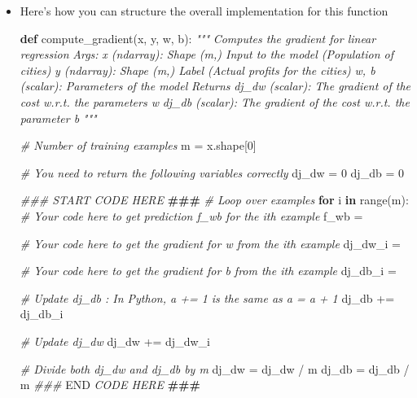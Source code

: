 \documentclass[11pt]{article}
\newenvironment{Shaded}{}{}
\newcommand{\KeywordTok}[1]{\textcolor[rgb]{0.00,0.44,0.13}{\textbf{{#1}}}}
\newcommand{\DecValTok}[1]{\textcolor[rgb]{0.25,0.63,0.44}{{#1}}}
\newcommand{\CommentTok}[1]{\textcolor[rgb]{0.38,0.63,0.69}{\textit{{#1}}}}
\newcommand{\AlertTok}[1]{\textcolor[rgb]{1.00,0.00,0.00}{\textbf{{#1}}}}
\newcommand{\RegionMarkerTok}[1]{{#1}}
\newcommand{\NormalTok}[1]{{#1}}
\newcommand{\ControlFlowTok}[1]{\textcolor[rgb]{0.00,0.44,0.13}{\textbf{{#1}}}}
\newcommand{\OperatorTok}[1]{\textcolor[rgb]{0.40,0.40,0.40}{{#1}}}
\newcommand{\BuiltInTok}[1]{{#1}}
\begin{document}
\begin{itemize}
\item
  Here's how you can structure the overall implementation for this
  function

\begin{Shaded}
\begin{Highlighting}[]
\KeywordTok{def}\NormalTok{ compute\_gradient(x, y, w, b): }
    \CommentTok{"""}
\CommentTok{    Computes the gradient for linear regression }
\CommentTok{    Args:}
\CommentTok{      x (ndarray): Shape (m,) Input to the model (Population of cities) }
\CommentTok{      y (ndarray): Shape (m,) Label (Actual profits for the cities)}
\CommentTok{      w, b (scalar): Parameters of the model  }
\CommentTok{    Returns}
\CommentTok{      dj\_dw (scalar): The gradient of the cost w.r.t. the parameters w}
\CommentTok{      dj\_db (scalar): The gradient of the cost w.r.t. the parameter b     }
\CommentTok{     """}

    \CommentTok{\# Number of training examples}
\NormalTok{    m }\OperatorTok{=}\NormalTok{ x.shape[}\DecValTok{0}\NormalTok{]}

    \CommentTok{\# You need to return the following variables correctly}
\NormalTok{    dj\_dw }\OperatorTok{=} \DecValTok{0}
\NormalTok{    dj\_db }\OperatorTok{=} \DecValTok{0}

    \CommentTok{\#\#\# START CODE HERE }\AlertTok{\#\#\#}\CommentTok{ }
    \CommentTok{\# Loop over examples}
    \ControlFlowTok{for}\NormalTok{ i }\KeywordTok{in} \BuiltInTok{range}\NormalTok{(m):  }
        \CommentTok{\# Your code here to get prediction f\_wb for the ith example}
\NormalTok{        f\_wb }\OperatorTok{=} 

        \CommentTok{\# Your code here to get the gradient for w from the ith example }
\NormalTok{        dj\_dw\_i }\OperatorTok{=} 

        \CommentTok{\# Your code here to get the gradient for b from the ith example }
\NormalTok{        dj\_db\_i }\OperatorTok{=} 

        \CommentTok{\# Update dj\_db : In Python, a += 1  is the same as a = a + 1}
\NormalTok{        dj\_db }\OperatorTok{+=}\NormalTok{ dj\_db\_i}

        \CommentTok{\# Update dj\_dw}
\NormalTok{        dj\_dw }\OperatorTok{+=}\NormalTok{ dj\_dw\_i}

    \CommentTok{\# Divide both dj\_dw and dj\_db by m}
\NormalTok{    dj\_dw }\OperatorTok{=}\NormalTok{ dj\_dw }\OperatorTok{/}\NormalTok{ m}
\NormalTok{    dj\_db }\OperatorTok{=}\NormalTok{ dj\_db }\OperatorTok{/}\NormalTok{ m}
    \CommentTok{\#\#\# }\RegionMarkerTok{END}\CommentTok{ CODE HERE }\AlertTok{\#\#\#}\CommentTok{ }


\end{Highlighting}
\end{Shaded}
\end{itemize}
\end{document}
